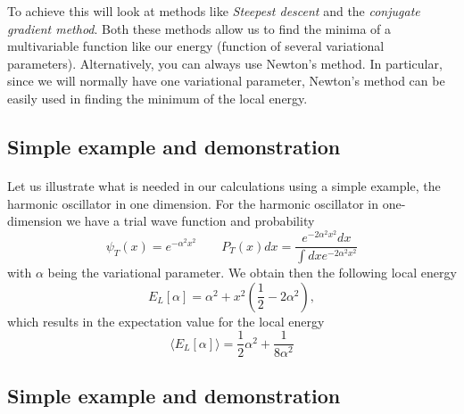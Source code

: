 \documentclass[%
oneside,                 %
final,                   %
10pt]{article}
\begin{document}
\noindent
To achieve this will look at methods like \emph{Steepest descent} and the \emph{conjugate gradient method}. Both these methods allow us to find
the minima of a multivariable  function like our energy (function of several variational parameters). 
Alternatively, you can always use Newton's method. In particular, since we will normally have one variational parameter,
Newton's method can be easily used in finding the minimum of the local energy.



\subsection*{Simple example and demonstration}

\paragraph{}
Let us illustrate what is needed in our calculations using a simple example, the harmonic oscillator in one dimension.
For the harmonic oscillator in one-dimension we have a  trial wave function and probability
\begin{equation*}
\psi_T(x) = e^{-\alpha^2 x^2} \qquad P_T(x)dx = \frac{e^{-2\alpha^2 x^2}dx}{\int dx e^{-2\alpha^2 x^2}}
\end{equation*}
with $\alpha$ being the variational parameter. 
We obtain then the following local energy
\begin{equation*}
E_L[\alpha] = \alpha^2+x^2\left(\frac{1}{2}-2\alpha^2\right),
\end{equation*}
which results in the expectation value for the local energy
\begin{equation*}
\langle  E_L[\alpha]\rangle = \frac{1}{2}\alpha^2+\frac{1}{8\alpha^2}
\end{equation*}





\subsection*{Simple example and demonstration}

\end{document}
